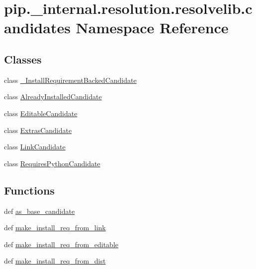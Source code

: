 \hypertarget{namespacepip_1_1__internal_1_1resolution_1_1resolvelib_1_1candidates}{}\section{pip.\+\_\+internal.\+resolution.\+resolvelib.\+candidates Namespace Reference}
\label{namespacepip_1_1__internal_1_1resolution_1_1resolvelib_1_1candidates}
\subsection*{Classes}
\begin{DoxyCompactItemize}
\item 
class \hyperlink{classpip_1_1__internal_1_1resolution_1_1resolvelib_1_1candidates_1_1__InstallRequirementBackedCandidate}{\+\_\+\+Install\+Requirement\+Backed\+Candidate}
\item 
class \hyperlink{classpip_1_1__internal_1_1resolution_1_1resolvelib_1_1candidates_1_1AlreadyInstalledCandidate}{Already\+Installed\+Candidate}
\item 
class \hyperlink{classpip_1_1__internal_1_1resolution_1_1resolvelib_1_1candidates_1_1EditableCandidate}{Editable\+Candidate}
\item 
class \hyperlink{classpip_1_1__internal_1_1resolution_1_1resolvelib_1_1candidates_1_1ExtrasCandidate}{Extras\+Candidate}
\item 
class \hyperlink{classpip_1_1__internal_1_1resolution_1_1resolvelib_1_1candidates_1_1LinkCandidate}{Link\+Candidate}
\item 
class \hyperlink{classpip_1_1__internal_1_1resolution_1_1resolvelib_1_1candidates_1_1RequiresPythonCandidate}{Requires\+Python\+Candidate}
\end{DoxyCompactItemize}
\subsection*{Functions}
\begin{DoxyCompactItemize}
\item 
def \hyperlink{namespacepip_1_1__internal_1_1resolution_1_1resolvelib_1_1candidates_a8fee9e414d9797e4341d55dd4b720d03}{as\+\_\+base\+\_\+candidate}
\item 
def \hyperlink{namespacepip_1_1__internal_1_1resolution_1_1resolvelib_1_1candidates_a6c84179e50d1a980142178c54dbfee96}{make\+\_\+install\+\_\+req\+\_\+from\+\_\+link}
\item 
def \hyperlink{namespacepip_1_1__internal_1_1resolution_1_1resolvelib_1_1candidates_a082cfa7e5f27f8a4e0538a6056ce7dc4}{make\+\_\+install\+\_\+req\+\_\+from\+\_\+editable}
\item 
def \hyperlink{namespacepip_1_1__internal_1_1resolution_1_1resolvelib_1_1candidates_a2e7de6039e53124df9b255c345f10172}{make\+\_\+install\+\_\+req\+\_\+from\+\_\+dist}
\end{DoxyCompactItemize}
